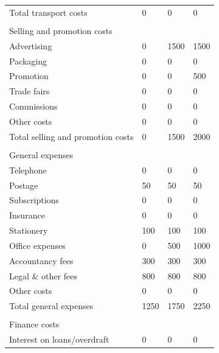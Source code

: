 \documentclass{article}
\begin{document}
\begin{table}[H]
\begin{tabular}{llll}
Total transport costs             & 0      & 0      & 0      \\
                                  &        &        &        \\
Selling and promotion costs       &        &        &        \\
Advertising                       & 0      & 1500   & 1500   \\
Packaging                         & 0      & 0      & 0      \\
Promotion                         & 0      & 0      & 500    \\
Trade fairs                       & 0      & 0      & 0      \\
Commissions                       & 0      & 0      & 0      \\
Other costs                       & 0      & 0      & 0      \\
Total selling and promotion costs & 0      & 1500   & 2000   \\
                                  &        &        &        \\
General expenses                  &        &        &        \\
Telephone                         & 0      & 0      & 0      \\
Postage                           & 50     & 50     & 50     \\
Subscriptions                     & 0      & 0      & 0      \\
Insurance                         & 0      & 0      & 0      \\
Stationery                        & 100    & 100    & 100    \\
Office expenses                   & 0      & 500    & 1000   \\
Accountancy fees                  & 300    & 300    & 300    \\
Legal \& other fees               & 800    & 800    & 800    \\
Other costs                       & 0      & 0      & 0      \\
Total general expenses            & 1250   & 1750   & 2250   \\
                                  &        &        &        \\
Finance costs                     &        &        &        \\
Interest on loans/overdraft       & 0      & 0      & 0      \\

\end{tabular}
\end{table}
\end{document}
